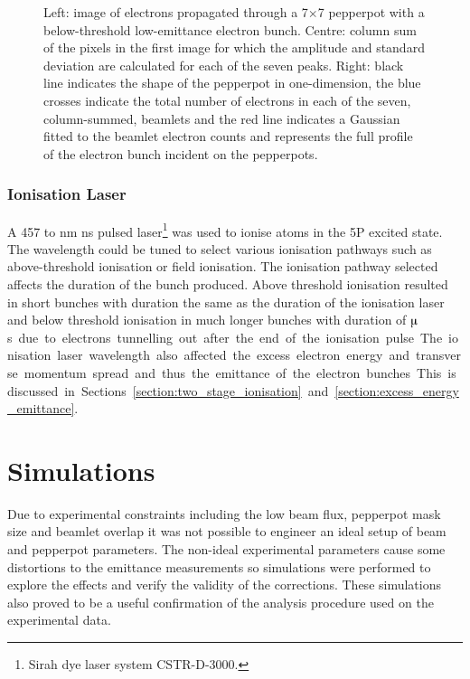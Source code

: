 \begin{figure}
    \center
    
    \caption[Determining the beam profile from a pepperpot measurement.]{Left: image of electrons propagated through a 7$\times$7 pepperpot with a below-threshold low-emittance electron bunch.
    Centre: column sum of the pixels in the first image for which the amplitude and standard deviation are calculated for each of the seven peaks.
    Right: black line indicates the shape of the pepperpot in one-dimension, the blue crosses indicate the total number of electrons in each of the seven, column-summed, beamlets and the red line indicates a Gaussian fitted to the beamlet electron counts and represents the full profile of the electron bunch incident on the pepperpots.}
    \label{figure:pepperpot_profile}
\end{figure}

\subsubsection{Ionisation Laser}
A 457 to \unit[493]{nm} \unit[5]{ns} pulsed laser\footnote{Sirah dye laser system CSTR-D-3000.} was used to ionise atoms in the 5P excited state.
The wavelength could be tuned to select various ionisation pathways such as above-threshold ionisation or field ionisation.
The ionisation pathway selected affects the duration of the bunch produced.
Above threshold ionisation resulted in short bunches with duration the same as the duration of the ionisation laser and below threshold ionisation in much longer bunches with duration of \unit[10s]{$\muup$s} due to electrons tunnelling out after the end of the ionisation pulse.

The ionisation laser wavelength also affected the excess electron energy and transverse momentum spread and thus the emittance of the electron bunches.
This is discussed in Sections~\ref{section:two_stage_ionisation} and \ref{section:excess_energy_emittance}.

\section{Simulations}\label{section:pepperpot_simulations}

Due to experimental constraints including the low beam flux, pepperpot mask size and beamlet overlap it was not possible to engineer an ideal setup of beam and pepperpot parameters.
The non-ideal experimental parameters cause some distortions to the emittance measurements so simulations were performed to explore the effects and verify the validity of the corrections.
These simulations also proved to be a useful confirmation of the analysis procedure used on the experimental data.

